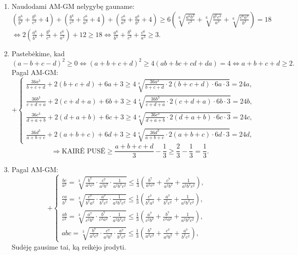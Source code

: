 \begin{enumerate}
$$\begin{array}{ll}
    \frac{b^3}{(1+c)(1+a)}+\frac{1+c}{8}+\frac{1+a}{8}\geq3\sqrt[3]{\frac{b^3}{(1+c)(1+a)}\cdot\frac{1+c}{8}\cdot\frac{1+a}{8}}=\frac{3b}{4},&\\
    \frac{c^3}{(1+a)(1+b)}+\frac{1+a}{8}+\frac{1+b}{8}\geq3\sqrt[3]{\frac{c^3}{(1+a)(1+b)}\cdot\frac{1+a}{8}\cdot\frac{1+b}{8}}=\frac{3c}{4},&
    \end{array}\right.$$
    $\Rightarrow\frac{a^3}{(1+b)(1+c)}+\frac{b^3}{(1+c)(1+a)}+\frac{c^3}{(1+a)(1+b)}\geq\frac{a+b+c}{2}-\frac{3}{4}\geq\frac{3\sqrt[3]{abc}}{2}-\frac{3}{4}=\frac{3}{4}.$
\item
    Naudodami AM-GM nelygybę gauname:\\
    $\left(\frac{a^6}{b^3}+\frac{b^6}{c^3}+4\right)+\left(\frac{b^6}{c^3}+\frac{c^6}{a^3}+4\right)+\left(\frac{c^6}{a^3}+\frac{a^6}{b^3}+4\right)\geq6\left(\sqrt[6]{\frac{a^6b^3}{c^3}}+\sqrt[6]{\frac{b^6c^3}{a^3}}+\sqrt[6]{\frac{c^6a^3}{b^3}}\right)=18$\\
    $\Leftrightarrow2\left(\frac{a^6}{b^3}+\frac{b^6}{c^3}+\frac{c^6}{a^3}\right)+12\geq18\Leftrightarrow\frac{a^6}{b^3}+\frac{b^6}{c^3}+\frac{c^6}{a^3}\geq3.$
\item
    Pastebėkime, kad \\
    $(a-b+c-d)^2\geq0\Leftrightarrow(a+b+c+d)^2\geq4(ab+bc+cd+da)=4\Leftrightarrow
    a+b+c+d\geq2.$ Pagal AM-GM: $$+\left\{\begin{array}{ll}
    \frac{36a^3}{b+c+d}+2(b+c+d)+6a+3\geq4\sqrt[4]{\frac{36a^3}{b+c+d}\cdot2(b+c+d)\cdot6a\cdot3}=24a,&\\
    \frac{36b^3}{c+d+a}+2(c+d+a)+6b+3\geq4\sqrt[4]{\frac{36b^3}{c+d+a}\cdot2(c+d+a)\cdot6b\cdot3}=24b,&\\
    \frac{36c^3}{d+a+b}+2(d+a+b)+6c+3\geq4\sqrt[4]{\frac{36c^3}{d+a+b}\cdot2(d+a+b)\cdot6c\cdot3}=24c,&\\
    \frac{36d^3}{a+b+c}+2(a+b+c)+6d+3\geq4\sqrt[4]{\frac{36d^3}{a+b+c}\cdot2(a+b+c)\cdot6d\cdot3}=24d,&
    \end{array}\right.$$ $$\Rightarrow\mbox{KAIRĖ
    PUSĖ}\geq{\frac{a+b+c+d}{3}}-\frac{1}{3}\geq\frac{2}{3}-\frac{1}{3}=\frac{1}{3}.$$
\item
    Pagal AM-GM: $$+\left\{\begin{array}{ll}
    \frac{bc}{a^2}=\sqrt[3]{\frac{b^7}{a^2c^2}\cdot\frac{c^7}{a^2b^2}\cdot\frac{1}{a^2b^2c^2}}\leq\frac{1}{3}\left(\frac{b^7}{a^2c^2}+\frac{c^7}{a^2b^2}+\frac{1}{a^2b^2c^2}\right),&\\
    \frac{ca}{b^2}=\sqrt[3]{\frac{c^7}{b^2a^2}\cdot\frac{a^7}{b^2c^2}\cdot\frac{1}{a^2b^2c^2}}\leq\frac{1}{3}\left(\frac{c^7}{b^2a^2}+\frac{a^7}{b^2c^2}+\frac{1}{a^2b^2c^2}\right),&\\
    \frac{ab}{c^2}=\sqrt[3]{\frac{a^7}{c^2b^2}\cdot\frac{b^7}{c^2a^2}\cdot\frac{1}{a^2b^2c^2}}\leq\frac{1}{3}\left(\frac{a^7}{c^2b^2}+\frac{b^7}{c^2a^2}+\frac{1}{a^2b^2c^2}\right),&\\
    abc=\sqrt[3]{\frac{b^7}{a^2c^2}\cdot\frac{c^7}{a^2b^2}\cdot\frac{a^7}{b^2c^2}}\leq\frac{1}{3}\left(\frac{b^7}{a^2c^2}+\frac{c^7}{a^2b^2}+\frac{a^7}{b^2c^2}\right),&
    \end{array}\right.$$ Sudėję gausime tai, ką reikėjo įrodyti.
\end{enumerate} 
